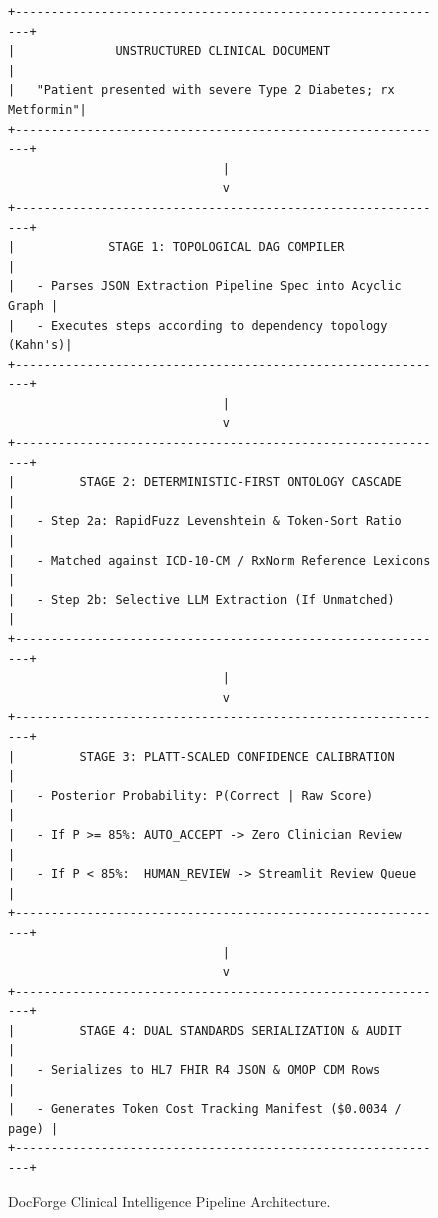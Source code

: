 \documentclass[10pt,journal,compsoc]{IEEEtran}
\begin{document}
\begin{figure}[!t]
\centering
\begin{lstlisting}
+-------------------------------------------------------------+
|              UNSTRUCTURED CLINICAL DOCUMENT                 |
|   "Patient presented with severe Type 2 Diabetes; rx Metformin"|
+-------------------------------------------------------------+
                              |
                              v
+-------------------------------------------------------------+
|             STAGE 1: TOPOLOGICAL DAG COMPILER               |
|   - Parses JSON Extraction Pipeline Spec into Acyclic Graph |
|   - Executes steps according to dependency topology (Kahn's)|
+-------------------------------------------------------------+
                              |
                              v
+-------------------------------------------------------------+
|         STAGE 2: DETERMINISTIC-FIRST ONTOLOGY CASCADE       |
|   - Step 2a: RapidFuzz Levenshtein & Token-Sort Ratio       |
|   - Matched against ICD-10-CM / RxNorm Reference Lexicons   |
|   - Step 2b: Selective LLM Extraction (If Unmatched)        |
+-------------------------------------------------------------+
                              |
                              v
+-------------------------------------------------------------+
|         STAGE 3: PLATT-SCALED CONFIDENCE CALIBRATION        |
|   - Posterior Probability: P(Correct | Raw Score)           |
|   - If P >= 85%: AUTO_ACCEPT -> Zero Clinician Review       |
|   - If P < 85%:  HUMAN_REVIEW -> Streamlit Review Queue     |
+-------------------------------------------------------------+
                              |
                              v
+-------------------------------------------------------------+
|         STAGE 4: DUAL STANDARDS SERIALIZATION & AUDIT       |
|   - Serializes to HL7 FHIR R4 JSON & OMOP CDM Rows          |
|   - Generates Token Cost Tracking Manifest ($0.0034 / page) |
+-------------------------------------------------------------+
\end{lstlisting}
\caption{DocForge Clinical Intelligence Pipeline Architecture.}
\label{fig:docforge_arch}
\end{figure}
\end{document}
